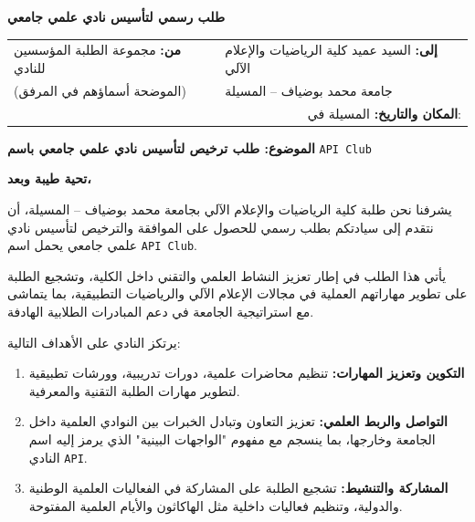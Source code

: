 \documentclass[12pt, a4paper]{article}
\begin{document}
\thispagestyle{fancy}

\begin{center}
    {\huge \textbf{طلب رسمي لتأسيس نادي علمي جامعي}}\\[5mm]
\end{center}

\begin{tabular}{|p{}|p{}|}
    \hline
    \textbf{من:} مجموعة الطلبة المؤسسين للنادي & 
    \textbf{إلى:} السيد عميد كلية الرياضيات والإعلام الآلي \\
    (الموضحة أسماؤهم في المرفق) & 
    جامعة محمد بوضياف – المسيلة \\
    \hline
    \multicolumn{2}{|r|}{\textbf{المكان والتاريخ:} المسيلة في: \hrulefill } \\
    \hline
\end{tabular}

\vspace{10mm}

\begin{center}
    {\Large \textbf{الموضوع: طلب ترخيص لتأسيس نادي علمي جامعي باسم}}
    {\texttt{API Club}}
\end{center}

\vspace{5mm}

\textbf{تحية طيبة وبعد،}

يشرفنا نحن طلبة كلية الرياضيات والإعلام الآلي بجامعة محمد بوضياف – المسيلة، أن نتقدم إلى سيادتكم بطلب رسمي للحصول على الموافقة والترخيص لتأسيس نادي علمي جامعي يحمل اسم {\texttt{API Club}}.

يأتي هذا الطلب في إطار تعزيز النشاط العلمي والتقني داخل الكلية، وتشجيع الطلبة على تطوير مهاراتهم العملية في مجالات الإعلام الآلي والرياضيات التطبيقية، بما يتماشى مع استراتيجية الجامعة في دعم المبادرات الطلابية الهادفة.

يرتكز النادي على الأهداف التالية:

\begin{enumerate}
    \item \textbf{التكوين وتعزيز المهارات:} تنظيم محاضرات علمية، دورات تدريبية، وورشات تطبيقية لتطوير مهارات الطلبة التقنية والمعرفية.
    \item \textbf{التواصل والربط العلمي:} تعزيز التعاون وتبادل الخبرات بين النوادي العلمية داخل الجامعة وخارجها، بما ينسجم مع مفهوم "الواجهات البينية" الذي يرمز إليه اسم النادي \texttt{API}.
    \item \textbf{المشاركة والتنشيط:} تشجيع الطلبة على المشاركة في الفعاليات العلمية الوطنية والدولية، وتنظيم فعاليات داخلية مثل الهاكاثون والأيام العلمية المفتوحة.
\end{enumerate}
\end{document}
